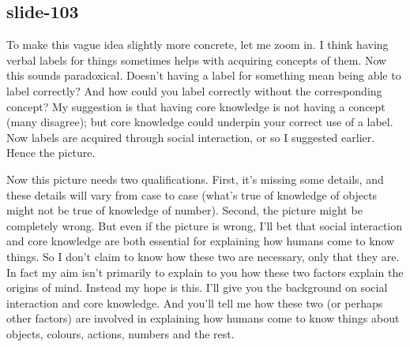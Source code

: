 \documentclass[12pt,\papersize]{extarticle}
\begin{document}
 
 
\subsection{slide-103}
To make this vague idea slightly more concrete, let me zoom in. I think having verbal labels for things sometimes helps with acquiring concepts of them. Now this sounds paradoxical. Doesn't having a label for something mean being able to label correctly? And how could you label correctly without the corresponding concept? My suggestion is that having core knowledge is not having a concept (many disagree); but core knowledge could underpin your correct use of a label. Now labels are acquired through social interaction, or so I suggested earlier. Hence the picture.
 
Now this picture needs two qualifications. First, it's missing some details, and these details will vary from case to case (what's true of knowledge of objects might not be true of knowledge of number). Second, the picture might be completely wrong. But even if the picture is wrong, I'll bet that social interaction and core knowledge are both essential for explaining how humans come to know things. So I don't claim to know how these two are necessary, only that they are. In fact my aim isn't primarily to explain to you how these two factors explain the origins of mind. Instead my hope is this. I'll give you the background on social interaction and core knowledge. And you'll tell me how these two (or perhaps other factors) are involved in explaining how humans come to know things about objects, colours, actions, numbers and the rest.
  
 






\end{document}
